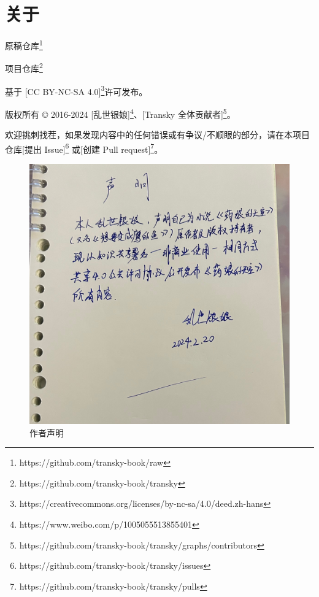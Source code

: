 \section{关于}

原稿仓库\footnote{https://github.com/transky-book/raw}

项目仓库\footnote{https://github.com/transky-book/transky}

基于 [CC BY-NC-SA 4.0]\footnote{https://creativecommons.org/licenses/by-nc-sa/4.0/deed.zh-hans}许可发布。

版权所有 © 2016-2024 [乱世银娘]\footnote{https://www.weibo.com/p/1005055513855401}、[Transky 全体贡献者]\footnote{https://github.com/transky-book/transky/graphs/contributors}。

欢迎挑刺找茬，如果发现内容中的任何错误或有争议/不顺眼的部分，请在本项目仓库[提出 Issue]\footnote{https://github.com/transky-book/transky/issues} 或[创建 Pull request]\footnote{https://github.com/transky-book/transky/pulls}。

\begin{figure}[hbt]
	\centering
	\includegraphics[scale=0.15]{../figures/agreement.jpg}
	\caption{作者声明}\label{agreement}
\end{figure}